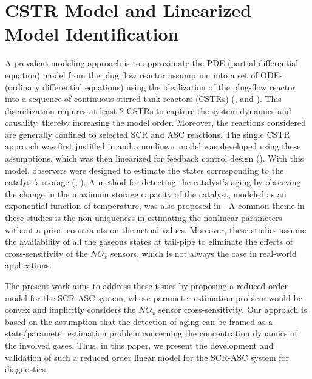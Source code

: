 \chapter{CSTR Model and Linearized Model Identification}

A prevalent modeling approach is to approximate the PDE (partial differential equation) model from the plug flow reactor
assumption into a set of ODEs (ordinary differential equations) using the idealization of the plug-flow reactor into a
sequence of continuous stirred tank reactors (CSTRs) (\cite{hsieh2011development}, and \cite{nova2014urea}). This
discretization requires at least 2 CSTRs to capture the system dynamics and causality, thereby increasing the model
order. Moreover, the reactions considered are generally confined to selected SCR and ASC reactions. The single CSTR
approach was first justified in \cite{devarakonda2008adequacy} and a nonlinear model was developed using these
assumptions, which was then linearized for feedback control design (\cite{devarakonda2009model}). With this model,
observers were designed to estimate the states corresponding to the catalyst's storage (\cite{ma2017observer},
\cite{jain2020term}). A method for detecting the catalyst's aging by observing the change in the maximum storage
capacity of the catalyst, modeled as an exponential function of temperature, was also proposed in \cite{ma2017observer}.
A common theme in these studies is the non-uniqueness in estimating the nonlinear parameters without a priori
constraints on the actual values. Moreover, these studies assume the availability of all the gaseous states at tail-pipe
to eliminate the effects of cross-sensitivity of the $NO_x$ sensors, which is not always the case in real-world
applications.

The present work aims to address these issues by proposing a reduced order model for the SCR-ASC system, whose parameter
estimation problem would be convex and implicitly considers the $NO_x$ sensor cross-sensitivity. Our approach is based
on the assumption that the detection of aging can be framed as a state/parameter estimation problem concerning the
concentration dynamics of the involved gases. Thus, in this paper, we present the development and validation of such a
reduced order linear model for the SCR-ASC system for diagnostics.






